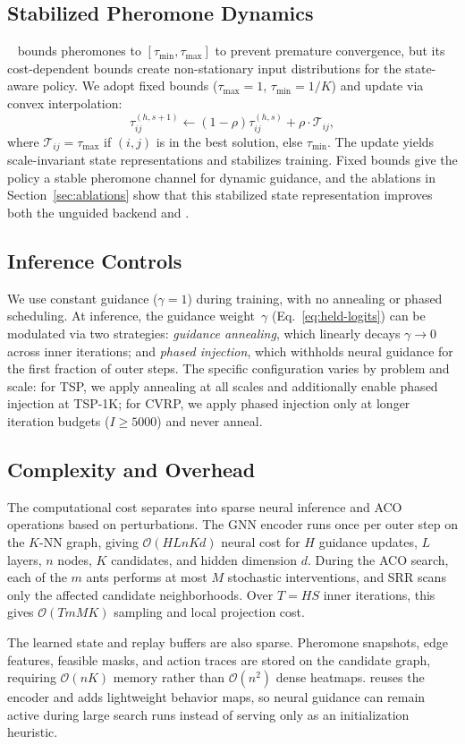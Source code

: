 \subsection{Stabilized Pheromone Dynamics}
\label{sec:smoothed-mmas}
\MMAS{}~\cite{maxmin} bounds pheromones to $[\tau_{\min}, \tau_{\max}]$ to prevent premature convergence, but its cost-dependent bounds create non-stationary input distributions for the state-aware policy. We adopt fixed bounds ($\tau_{\max}{=}1$, $\tau_{\min}{=}1/K$) and update via convex interpolation:
\begin{equation}
\tau^{(h,s+1)}_{ij} \leftarrow (1-\rho)\tau^{(h,s)}_{ij} + \rho \cdot \mathcal{T}_{ij},
\label{eq:smoothed-mmas}
\end{equation}
where $\mathcal{T}_{ij} = \tau_{\max}$ if $(i,j)$ is in the best solution, else $\tau_{\min}$.
The update yields scale-invariant state representations and stabilizes training.
Fixed bounds give the policy a stable pheromone channel for dynamic guidance, and the ablations in Section~\ref{sec:ablations} show that this stabilized state representation improves both the unguided backend and \DyNACO{}.

\subsection{Inference Controls}
\label{sec:inference}
We use constant guidance ($\gamma{=}1$) during training, with no annealing or phased scheduling.
At inference, the guidance weight~$\gamma$ (Eq.~\ref{eq:held-logits}) can be modulated via two strategies: \emph{guidance annealing}, which linearly decays $\gamma \to 0$ across inner iterations; and \emph{phased injection}, which withholds neural guidance for the first fraction of outer steps.
The specific configuration varies by problem and scale: for TSP, we apply annealing at all scales and additionally enable phased injection at TSP-1K; for CVRP, we apply phased injection only at longer iteration budgets ($I{\geq}5000$) and never anneal.

\subsection{Complexity and Overhead}
\label{sec:complexity}

The computational cost separates into sparse neural inference and ACO operations based on perturbations. The GNN encoder runs once per outer step on the $K$-NN graph, giving $\mathcal{O}(H L n K d)$ neural cost for $H$ guidance updates, $L$ layers, $n$ nodes, $K$ candidates, and hidden dimension $d$. During the ACO search, each of the $m$ ants performs at most $M$ stochastic interventions, and SRR scans only the affected candidate neighborhoods. Over $T=H S$ inner iterations, this gives $\mathcal{O}(T m M K)$ sampling and local projection cost.

The learned state and replay buffers are also sparse. Pheromone snapshots, edge features, feasible masks, and action traces are stored on the candidate graph, requiring $\mathcal{O}(nK)$ memory rather than $\mathcal{O}(n^2)$ dense heatmaps. \DyNACS{} reuses the \DyNACO{} encoder and adds lightweight behavior maps, so neural guidance can remain active during large search runs instead of serving only as an initialization heuristic.
